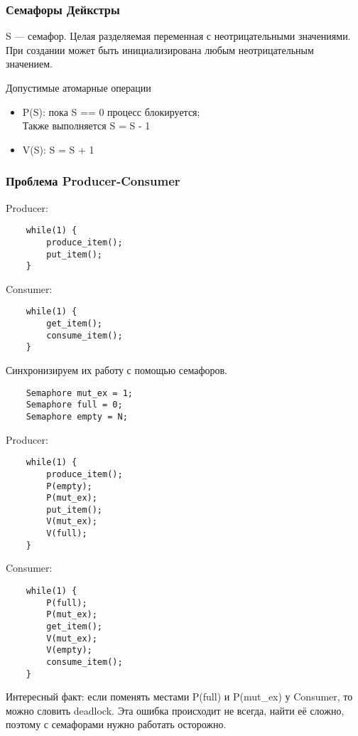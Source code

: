 \documentclass[12pt, a4paper]{article}
\begin{document}
    \subsubsection*{Семафоры Дейкстры}
    S --- семафор. Целая разделяемая переменная с неотрицательными значениями.\\
    При создании может быть инициализирована любым неотрицательным значением.
    \begin{center}
        Допустимые атомарные операции
    \end{center}
    \begin{itemize}
        \item P(S): пока S == 0 процесс блокируется;\\
        Также выполняется S = S - 1
        \item V(S): S = S + 1
    \end{itemize}
    \subsubsection*{Проблема Producer-Consumer}
    Producer:
    \begin{lstlisting}
    while(1) {
        produce_item();
        put_item();
    }
    \end{lstlisting}
    Consumer:\
    \begin{lstlisting}
    while(1) {
        get_item();
        consume_item();
    }
    \end{lstlisting}
    Синхронизируем их работу с помощью семафоров.\\
    \begin{lstlisting}
    Semaphore mut_ex = 1;
    Semaphore full = 0;
    Semaphore empty = N;
    \end{lstlisting}
    Producer:
    \begin{lstlisting}
    while(1) {
        produce_item();
        P(empty);
        P(mut_ex);
        put_item();
        V(mut_ex);
        V(full);
    }
    \end{lstlisting}
    Consumer:
    \begin{lstlisting}
    while(1) {
        P(full);
        P(mut_ex);
        get_item();
        V(mut_ex);
        V(empty);
        consume_item();
    }
    \end{lstlisting}
    Интересный факт: если поменять местами P(full) и P(mut\_ex) у Consumer, то можно словить deadlock. Эта ошибка происходит не всегда, найти её сложно, поэтому с семафорами нужно работать осторожно.
\end{document}
